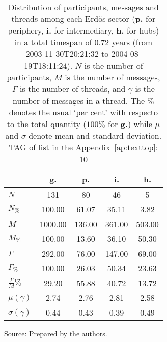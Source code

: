 \begin{table}[h!]
\begin{center}
\caption{Distribution of participants, messages and threads among each Erd\"os sector ({\bf p.} for periphery, {\bf i.} for intermediary, 
    {\bf h.} for hubs) in a total timespan of 0.72 years (from 2003-11-30T20:21:32 to 2004-08-19T18:11:24). $N$ is the number of participants, $M$ is the number of messages, $\Gamma$ is the number of threads, and $\gamma$ is the number of messages in a thread.
    The \% denotes the usual `per cent' with respecto to the total quantity ($100\%$ for {\bf g.})
    while $\mu$ and $\sigma$ denote mean and standard deviation. TAG of list in the Appendix~\ref{ap:texttop}: 10}\label{geralListas}    
\begin{tabular}{| l || c | c | c | c |}\hline
 & {\bf g.} & {\bf p.} & {\bf i.} & {\bf h.} \\\hline\hline
$N$ & 131  & 80  & 46  & 5 \\
$N_{\%}$ & 100.00  & 61.07  & 35.11  & 3.82 \\\hline
$M$ & 1000.00  & 136.00  & 361.00  & 503.00 \\
$M_{\%}$ & 100.00  & 13.60  & 36.10  & 50.30 \\\hline
$\Gamma$ & 292.00  & 76.00  & 147.00  & 69.00 \\
$\Gamma_{\%}$ & 100.00  & 26.03  & 50.34  & 23.63 \\\hline
$\frac{\Gamma}{M}\%$ & 29.20  & 55.88  & 40.72  & 13.72 \\
$\mu(\gamma)$ & 2.74  & 2.76  & 2.81  & 2.58 \\
$\sigma(\gamma)$ & 0.44  & 0.43  & 0.39  & 0.49 \\\hline
\end{tabular}
\end{center}
\begin{flushleft}
		Source: Prepared by the authors.\
\end{flushleft}
\end{table}
